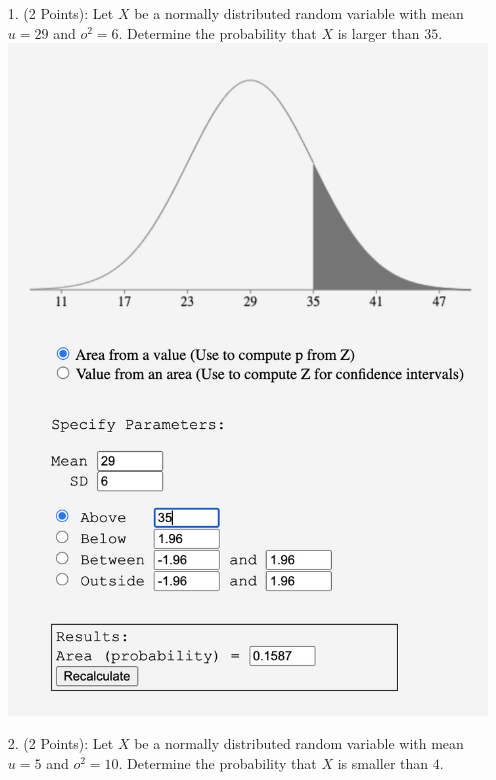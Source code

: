 \documentclass[a4paper]{article}
\begin{document}
\begin{itemize}
    \item[1.] (2 Points): Let $X$ be a normally distributed random variable with mean $u = 29$ and $o^2 = 6$. Determine the probability that $X$ is larger than $35$. \\
    \includegraphics[scale=0.5]{Question-1.png} 
    \item[2.] (2 Points): Let $X$ be a normally distributed random variable with mean $u = 5$ and $o^2 = 10$. Determine the probability that $X$ is smaller than $4$. \\

\end{itemize}
\end{document}
